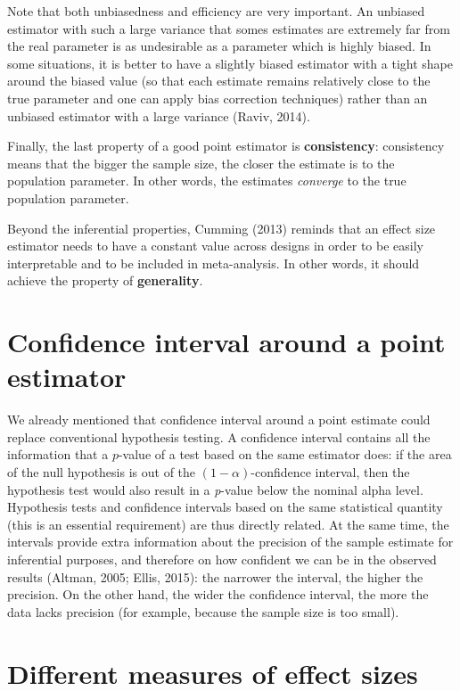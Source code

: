 \documentclass[
  man,floatsintext]{apa6}
\begin{document}
Note that both unbiasedness and efficiency are very important. An unbiased estimator with such a large variance that somes estimates are extremely far from the real parameter is as undesirable as a parameter which is highly biased. In some situations, it is better to have a slightly biased estimator with a tight shape around the biased value (so that each estimate remains relatively close to the true parameter and one can apply bias correction techniques) rather than an unbiased estimator with a large variance (Raviv, 2014).

Finally, the last property of a good point estimator is \textbf{consistency}: consistency means that the bigger the sample size, the closer the estimate is to the population parameter. In other words, the estimates \emph{converge} to the true population parameter.

Beyond the inferential properties, Cumming (2013) reminds that an effect size estimator needs to have a constant value across designs in order to be easily interpretable and to be included in meta-analysis. In other words, it should achieve the property of \textbf{generality}.

\hypertarget{confidence-interval-around-a-point-estimator}{%
\section{Confidence interval around a point estimator}\label{confidence-interval-around-a-point-estimator}}

We already mentioned that confidence interval around a point estimate could replace conventional hypothesis testing. A confidence interval contains all the information that a \(p\)-value of a test based on the same estimator does: if the area of the null hypothesis is out of the \((1-\alpha)\)-confidence interval, then the hypothesis test would also result in a \emph{p}-value below the nominal alpha level. Hypothesis tests and confidence intervals based on the same statistical quantity (this is an essential requirement) are thus directly related. At the same time, the intervals provide extra information about the precision of the sample estimate for inferential purposes, and therefore on how confident we can be in the observed results (Altman, 2005; Ellis, 2015): the narrower the interval, the higher the precision. On the other hand, the wider the confidence interval, the more the data lacks precision (for example, because the sample size is too small).

\hypertarget{different-measures-of-effect-sizes}{%
\section{Different measures of effect sizes}\label{different-measures-of-effect-sizes}}
\end{document}
